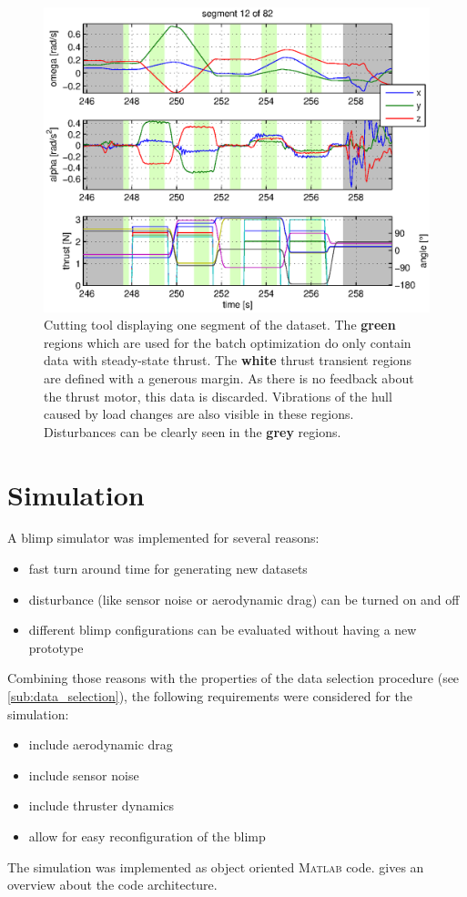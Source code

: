 \begin{figure}[htbp]
\centering
\includegraphics[scale=0.8]{images/interactive_cut/interactive_cut_detail_modified.eps}
\caption{Cutting tool displaying one segment of the dataset. 
The \textbf{green} regions which are used for the batch optimization do only contain data with steady-state thrust. 
The \textbf{white} thrust transient regions are defined with a generous margin.
As there is no feedback about the thrust motor, this data is discarded.
Vibrations of the hull caused by load changes are also visible in these regions.
Disturbances can be clearly seen in the \textbf{grey} regions.
}
\label{fig:data_selection_short}
\end{figure}

\section{Simulation}
\label{sec:simulation}
A blimp simulator was implemented for several reasons:
\begin{itemize}
\item fast turn around time for generating new datasets
\item disturbance (like sensor noise or aerodynamic drag) can be turned on and off
\item different blimp configurations can be evaluated without having a new prototype
\end{itemize}

Combining those reasons with the properties of the data selection procedure (see \cref{sub:data_selection}), the following requirements were considered for the simulation:
\begin{itemize}
\item include aerodynamic drag
\item include sensor noise
\item include thruster dynamics
\item allow for easy reconfiguration of the blimp
\end{itemize}
The simulation was implemented as object oriented \textsc{Matlab} code.
 gives an overview about the code architecture.

